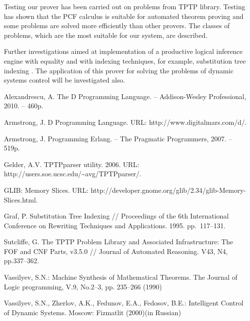 \documentclass[runningheads,a4paper]{llncs}
\begin{document}
Testing our prover has been carried out on problems from TPTP library. Testing has shown that the PCF calculus is suitable for automated theorem proving and some problems are solved more efficiently than other provers. The classes of problems, which are the most suitable for our system, are described.

Further investigations aimed at implementation of a productive logical inference engine with equality and with indexing techniques, for example, substitution tree indexing \cite{subtree}. The application of this prover for solving the problems of dynamic systems control will be investigated also.



\begin{thebibliography}{4}

 Alexandrescu, A. The D Programming Language. -- Addison-Wesley Professional, 2010. -- 460p.

 Armstrong, J. D Programming Language. URL: http://www.digitalmars.com/d/.

 Armstrong, J. Programming Erlang.  -- The Pragmatic Programmers, 2007. -- 519p.

 Gelder, A.V. TPTPparser utility. 2006. URL: http://users.soe.ucsc.edu/\~{}avg/TPTPparser/.

 GLIB: Memory Slices. URL: http://developer.gnome.org/glib/2.34/glib-Memory-Slices.html.

 Graf, P. Substitution Tree Indexing // Proceedings of the 6th International Conference on Rewriting Techniques and Applications. 1995. pp.~117--131.


 Sutcliffe, G. The TPTP Problem Library and Associated Infrastructure: The FOF and CNF Parts, v3.5.0 // Journal of Automated Reasoning. V43, N4, pp.337--362.

 Vassilyev, S.N.: Machine Synthesis of Mathematical Theorems. The Journal of Logic programming, V.9, No.2--3, pp. 235--266 (1990)

 Vassilyev, S.N., Zherlov, A.K., Fedunov, E.A.,
Fedosov, B.E.: Intelligent Control of Dynamic Systems. Moscow: Fizmatlit (2000)(in Russian)

\end{thebibliography}
\end{document}
